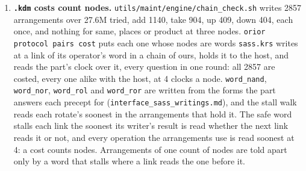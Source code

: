 \begin{enumerate}
\begin{itemize}
\end{itemize}
\item \textbf{\texttt{.\allowbreak{}kdm} costs count nodes.} \texttt{utils/\allowbreak{}maint/\allowbreak{}engine/\allowbreak{}chain\_\allowbreak{}check.\allowbreak{}sh} writes 2857 arrangements over 27.6M tried, add 1140, take 904, up 409, down 404, each once, and nothing for same, places or product at three nodes. \texttt{orior protocol pairs cost} puts each one whose nodes are words \texttt{sass.\allowbreak{}krs} writes at a link of its operator's word in a chain of ours, holds it to the host, and reads the part's clock over it, every question in one round: all 2857 are costed, every one alike with the host, at 4 clocks a node. \texttt{word\_\allowbreak{}nand}, \texttt{word\_\allowbreak{}nor}, \texttt{word\_\allowbreak{}rol} and \texttt{word\_\allowbreak{}ror} are written from the forms the part answers each precept for (\texttt{interface\_\allowbreak{}sass\_\allowbreak{}writings.\allowbreak{}md}), and the stall walk reads each rotate's soonest in the arrangements that hold it. The safe word stalls each link the soonest its writer's result is read whether the next link reads it or not, and every operation the arrangements use is read soonest at 4: a cost counts nodes. Arrangements of one count of nodes are told apart only by a word that stalls where a link reads the one before it.

\end{enumerate}

